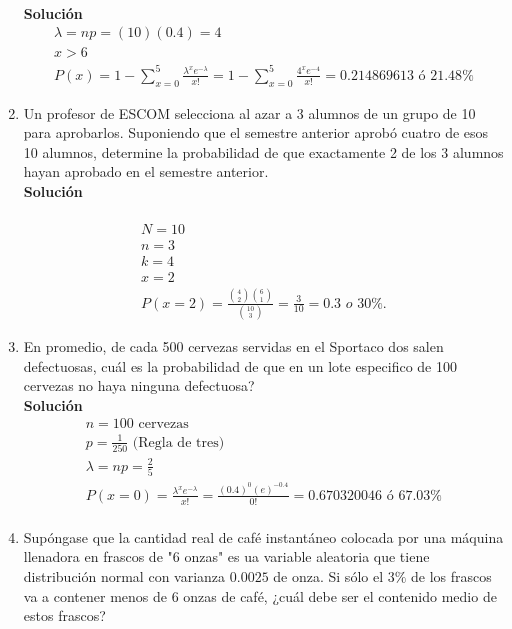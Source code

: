 \begin{enumerate}
    \\\textbf{Solución}
    \\
    \begin{gather*}
    \lambda=np=(10)(0.4) = 4\\
    x>6\\
    P(x) =1-\sum _{x=0}^{5}\frac{{\lambda}^{x}{e}^{-\lambda}}{x!}=1 - \sum _{x=0}^{5}\frac{{4}^{x}{e}^{-4}}{x!} =  0.214869613 \text{ ó } 21.48\%
    \end{gather*}
    \item Un profesor de ESCOM selecciona al azar a 3 alumnos de un grupo de 10 para aprobarlos. Suponiendo que el semestre anterior aprobó cuatro de esos 10 alumnos, determine la probabilidad de que exactamente 2 de los 3 alumnos hayan aprobado en el semestre anterior.
    \\\textbf{Solución}
    \\ \\
    \begin{gather*}
    N = 10 \\
    n = 3 \\
    k = 4 \\
    x = 2 \\
    P(x = 2) = \frac{ \binom{4}{2} \binom{6}{1}}{\binom{10}{3}} = \frac{3}{10} = 0.3 \textit{ o 30\%.}
    \end{gather*}
    \item En promedio, de cada 500 cervezas servidas en el Sportaco dos salen defectuosas, cuál es la probabilidad de que en un lote especifico de 100 cervezas no haya ninguna defectuosa?
    \\\textbf{Solución}
    \begin{gather*}
    n = 100 \text{ cervezas}\\
    p = \frac{1}{250} \text{ (Regla de tres)}\\
    \lambda = np = \frac{2}{5}\\
    P(x=0) = \frac{{\lambda}^{x}{e}^{-\lambda}}{x!}=\frac{(0.4)^{0}(e)^{-0.4}}{0!}= 0.670320046 \text{ ó } 67.03\%\\
    \end{gather*}
    \setcounter{enumi}{23}
    \item Supóngase que la cantidad real de café instantáneo colocada por una máquina llenadora en frascos de "6 onzas" es ua variable aleatoria que tiene distribución normal con varianza $0.0025$ de onza. Si sólo el $3\%$ de los frascos va a contener menos de 6 onzas de café, ¿cuál debe ser el contenido medio de estos frascos?\\

\end{enumerate}
